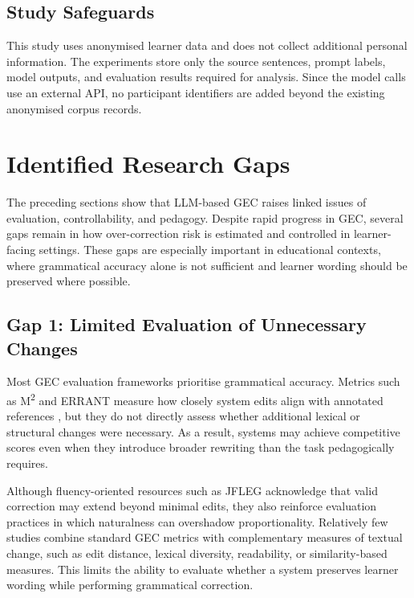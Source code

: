 \subsection{Study Safeguards}

This study uses anonymised learner data and does not collect additional personal information. The experiments store only the source sentences, prompt labels, model outputs, and evaluation results required for analysis. Since the model calls use an external API, no participant identifiers are added beyond the existing anonymised corpus records.

\section{Identified Research Gaps}

The preceding sections show that LLM-based GEC raises linked issues of evaluation, controllability, and pedagogy. Despite rapid progress in GEC, several gaps remain in how over-correction risk is estimated and controlled in learner-facing settings. These gaps are especially important in educational contexts, where grammatical accuracy alone is not sufficient and learner wording should be preserved where possible.

\subsection{Gap 1: Limited Evaluation of Unnecessary Changes}

Most GEC evaluation frameworks prioritise grammatical accuracy. Metrics such as M\textsuperscript{2} and ERRANT measure how closely system edits align with annotated references \cite{dahlmeier-ng-2012-better,bryant-etal-2017-automatic}, but they do not directly assess whether additional lexical or structural changes were necessary. As a result, systems may achieve competitive scores even when they introduce broader rewriting than the task pedagogically requires.

Although fluency-oriented resources such as JFLEG \cite{napoles-etal-2017-jfleg} acknowledge that valid correction may extend beyond minimal edits, they also reinforce evaluation practices in which naturalness can overshadow proportionality. Relatively few studies combine standard GEC metrics with complementary measures of textual change, such as edit distance, lexical diversity, readability, or similarity-based measures. This limits the ability to evaluate whether a system preserves learner wording while performing grammatical correction.

